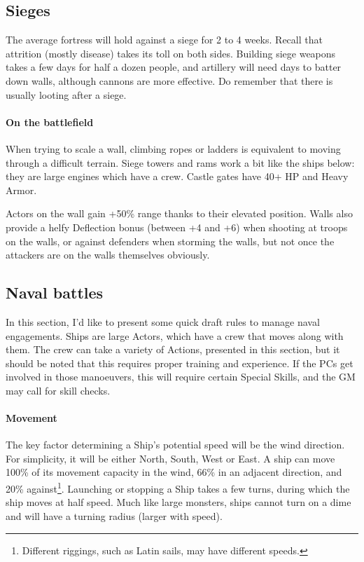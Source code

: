\subsection{Sieges}

The average fortress will hold against a siege for 2 to 4 weeks. Recall that attrition (mostly disease) takes its toll on both sides. Building siege weapons takes a few days for half a dozen people, and artillery will need days to batter down walls, although cannons are more effective. Do remember that there is usually looting after a siege.


\paragraph{On the battlefield}

When trying to scale a wall, climbing ropes or ladders is equivalent to moving through a difficult terrain. Siege towers and rams work a bit like the ships below: they are large engines which have a crew. Castle gates have 40+ HP and Heavy Armor.

Actors on the wall gain +50\% range thanks to their elevated position. Walls also provide a helfy Deflection bonus (between +4 and +6) when shooting at troops on the walls, or against defenders when storming the walls, but not once the attackers are on the walls themselves obviously.


\subsection{Naval battles}

In this section, I'd like to present some quick draft rules to manage naval engagements. Ships are large Actors, which have a crew that moves along with them. The crew can take a variety of Actions, presented in this section, but it should be noted that this requires proper training and experience. If the PCs get involved in those manoeuvers, this will require certain Special Skills, and the GM may call for skill checks.

\paragraph{Movement}

The key factor determining a Ship's potential speed will be the wind direction. For simplicity, it will be either North, South, West or East. A ship can move 100\% of its movement capacity in the wind, 66\% in an adjacent direction, and 20\% against\footnote{Different riggings, such as Latin sails, may have different speeds.}. Launching or stopping a Ship takes a few turns, during which the ship moves at half speed. Much like large monsters, ships cannot turn on a dime and will have a turning radius (larger with speed).

